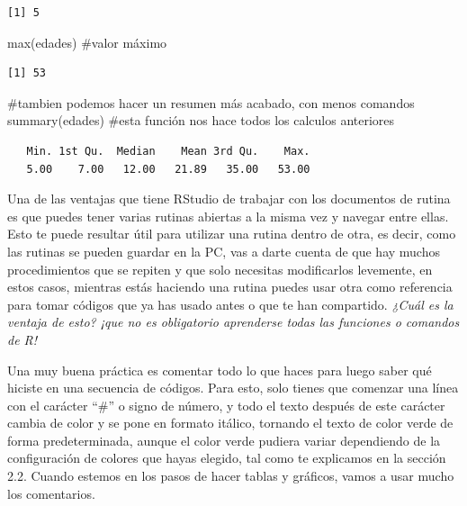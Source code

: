 \documentclass[
  letterpaper,
  DIV=11,
  numbers=noendperiod]{scrreprt}
\newenvironment{Shaded}{\begin{snugshade}}{\end{snugshade}}
\newcommand{\CommentTok}[1]{\textcolor[rgb]{0.37,0.37,0.37}{#1}}
\newcommand{\FunctionTok}[1]{\textcolor[rgb]{0.28,0.35,0.67}{#1}}
\newcommand{\NormalTok}[1]{\textcolor[rgb]{0.00,0.23,0.31}{#1}}
\begin{document}
\begin{verbatim}
[1] 5
\end{verbatim}

\begin{Shaded}
\begin{Highlighting}[]
\FunctionTok{max}\NormalTok{(edades)    }\CommentTok{\#valor máximo  }
\end{Highlighting}
\end{Shaded}

\begin{verbatim}
[1] 53
\end{verbatim}

\begin{Shaded}
\begin{Highlighting}[]
\CommentTok{\#tambien podemos hacer un resumen más acabado, con menos comandos}
\FunctionTok{summary}\NormalTok{(edades) }\CommentTok{\#esta función nos hace todos los calculos anteriores}
\end{Highlighting}
\end{Shaded}

\begin{verbatim}
   Min. 1st Qu.  Median    Mean 3rd Qu.    Max. 
   5.00    7.00   12.00   21.89   35.00   53.00 
\end{verbatim}

Una de las ventajas que tiene RStudio de trabajar con los documentos de
rutina es que puedes tener varias rutinas abiertas a la misma vez y
navegar entre ellas. Esto te puede resultar útil para utilizar una
rutina dentro de otra, es decir, como las rutinas se pueden guardar en
la PC, vas a darte cuenta de que hay muchos procedimientos que se
repiten y que solo necesitas modificarlos levemente, en estos casos,
mientras estás haciendo una rutina puedes usar otra como referencia para
tomar códigos que ya has usado antes o que te han compartido.
\emph{¿Cuál es la ventaja de esto? ¡que no es obligatorio aprenderse
todas las funciones o comandos de R!}

Una muy buena práctica es comentar todo lo que haces para luego saber
qué hiciste en una secuencia de códigos. Para esto, solo tienes que
comenzar una línea con el carácter ``\#'' o signo de número, y todo el
texto después de este carácter cambia de color y se pone en formato
itálico, tornando el texto de color verde de forma predeterminada,
aunque el color verde pudiera variar dependiendo de la configuración de
colores que hayas elegido, tal como te explicamos en la sección 2.2.
Cuando estemos en los pasos de hacer tablas y gráficos, vamos a usar
mucho los comentarios.
\end{document}
